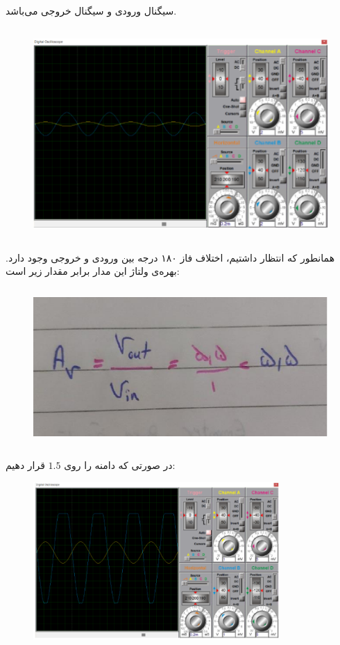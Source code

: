 \documentclass[12pt]{article}
\begin{document}
سیگنال  ورودی و سیگنال  خروجی می‌باشد.
\begin{figure}[H]
	\begin{center}
		\includegraphics[width=\textwidth, height=8cm]{./images/9.9}
	\end{center}
\end{figure}

همانطور که انتظار داشتیم، اختلاف فاز ۱۸۰ درجه بین ورودی و خروجی وجود دارد. بهره‌ی ولتاژ این مدار برابر مقدار زیر است:

\begin{figure}[H]
	\begin{center}
		\includegraphics[width=\textwidth, height=6cm]{./images/9.7.2}
	\end{center}
\end{figure}

در صورتی که دامنه را روی $1.5$ قرار دهیم:

\begin{figure}[H]
	\begin{center}
		\includegraphics[width=\textwidth, height=6cm]{./images/9.10}
	\end{center}
\end{figure}
\end{document}
